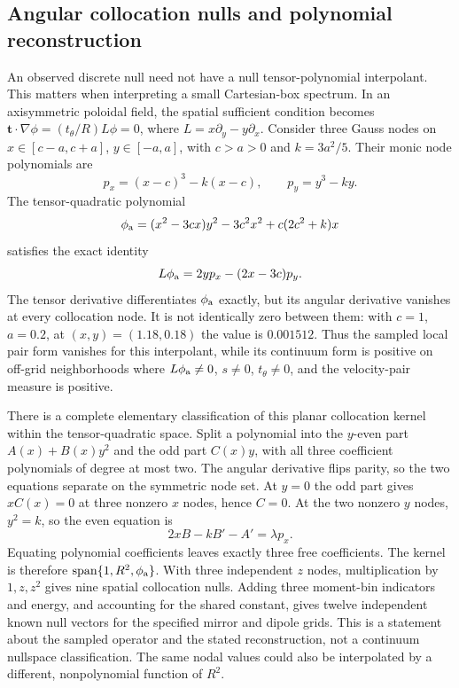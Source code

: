 \documentclass[11pt,letterpaper]{article}
\begin{document}
\subsection*{Angular collocation nulls and polynomial reconstruction}
An observed discrete null need not have a null tensor-polynomial interpolant.
This matters when interpreting a small Cartesian-box spectrum. In an
axisymmetric poloidal field, the spatial sufficient condition becomes
$\mathbf t\cdot\nabla\phi=(t_\theta/R)L\phi=0$, where
$L=x\partial_y-y\partial_x$. Consider three Gauss nodes on
$x\in[c-a,c+a]$, $y\in[-a,a]$, with $c>a>0$ and
$k=3a^2/5$. Their monic node polynomials are
\[
 p_x=(x-c)^3-k(x-c),\qquad p_y=y^3-ky.
\]
The tensor-quadratic polynomial
\begin{equation}
 \phi_{\rm a}=(x^2-3cx)y^2-3c^2x^2+c(2c^2+k)x
 \label{eq:angularalias}
\end{equation}
satisfies the exact identity
\begin{equation}
 L\phi_{\rm a}=2y p_x-(2x-3c)p_y.
 \label{eq:angularaliasidentity}
\end{equation}
The tensor derivative differentiates $\phi_{\rm a}$ exactly, but its angular
derivative vanishes at every collocation node. It is not identically zero
between them: with $c=1$, $a=0.2$, at $(x,y)=(1.18,0.18)$ the value is
$0.001512$. Thus the sampled local pair form vanishes for this interpolant,
while its continuum form is positive on off-grid neighborhoods where
$L\phi_{\rm a}\ne0$, $s\ne0$, $t_\theta\ne0$, and the velocity-pair
measure is positive.

There is a complete elementary classification of this planar collocation
kernel within the tensor-quadratic space. Split a polynomial into the
$y$-even part $A(x)+B(x)y^2$ and the odd part $C(x)y$, with all three
coefficient polynomials of degree at most two. The angular derivative flips
parity, so the two equations separate on the symmetric node set. At $y=0$
the odd part gives $xC(x)=0$ at three nonzero $x$ nodes, hence $C=0$.
At the two nonzero $y$ nodes, $y^2=k$, so the even equation is
\[
 2x B-k B'-A'=\lambda p_x.
\]
Equating polynomial coefficients leaves exactly three free coefficients.
The kernel is therefore $\operatorname{span}\{1,R^2,\phi_{\rm a}\}$.
With three independent $z$ nodes, multiplication by $1,z,z^2$ gives nine
spatial collocation nulls. Adding three moment-bin indicators and energy,
and accounting for the shared constant, gives twelve independent known
null vectors for the specified mirror and dipole grids. This is a statement
about the sampled operator and the stated reconstruction, not a continuum
nullspace classification. The same nodal values could also be interpolated
by a different, nonpolynomial function of $R^2$.
\end{document}
